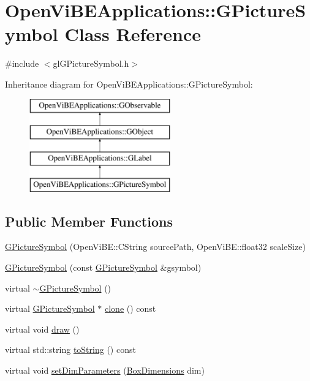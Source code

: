 \hypertarget{classOpenViBEApplications_1_1GPictureSymbol}{
\section{OpenViBEApplications::GPictureSymbol Class Reference}
\label{classOpenViBEApplications_1_1GPictureSymbol}
}


{\ttfamily \#include $<$glGPictureSymbol.h$>$}

Inheritance diagram for OpenViBEApplications::GPictureSymbol:\begin{figure}[H]
\begin{center}
\leavevmode
\includegraphics[height=4.000000cm]{classOpenViBEApplications_1_1GPictureSymbol}
\end{center}
\end{figure}
\subsection*{Public Member Functions}
\begin{DoxyCompactItemize}
\item 
\hyperlink{classOpenViBEApplications_1_1GPictureSymbol_aac73ebde57146de0bbb6724833c53cf8}{GPictureSymbol} (OpenViBE::CString sourcePath, OpenViBE::float32 scaleSize)
\item 
\hyperlink{classOpenViBEApplications_1_1GPictureSymbol_aa6018be99bc4605f4a70164d40fd0a71}{GPictureSymbol} (const \hyperlink{classOpenViBEApplications_1_1GPictureSymbol}{GPictureSymbol} \&gsymbol)
\item 
virtual \hyperlink{classOpenViBEApplications_1_1GPictureSymbol_a6ac3188bac96439e918ae2cb4c087ca2}{$\sim$GPictureSymbol} ()
\item 
virtual \hyperlink{classOpenViBEApplications_1_1GPictureSymbol}{GPictureSymbol} $\ast$ \hyperlink{classOpenViBEApplications_1_1GPictureSymbol_ab6242401d181519cd7095d800b74fd2a}{clone} () const 
\item 
virtual void \hyperlink{classOpenViBEApplications_1_1GPictureSymbol_ae4599b766493b68a3be8d0002cb7eb59}{draw} ()
\item 
virtual std::string \hyperlink{classOpenViBEApplications_1_1GPictureSymbol_a1dcff61ca3a281b9ff86f90761a6dc2f}{toString} () const 
\item 
virtual void \hyperlink{classOpenViBEApplications_1_1GPictureSymbol_adbd8bcc5e9a366b939ec9020c7e661d8}{setDimParameters} (\hyperlink{structOpenViBEApplications_1_1__BoxDimensions}{BoxDimensions} dim)
\end{DoxyCompactItemize}

